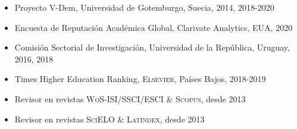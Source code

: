 





\begin{publications}

\begin{itemize}
\item{\small Proyecto V-Dem, Universidad de Gotemburgo, Suecia, 2014, 2018-2020}
\item{\small Encuesta de Reputación Académica Global, Clarivate Analytics, EUA, 2020}
\item{\small Comisión Sectorial de Investigación, Universidad de la Rep\'ublica, Uruguay, 2016, 2018}
\item{\small Times Higher Education Ranking, {\scshape Elsevier}, 
Países Bajos, 2018-2019}
\item{\small Revisor en revistas {\scshape WoS-ISI/SSCI/ESCI} \& {\scshape Scopus}, desde 2013}
\item{\small Revisor en revistas {\scshape SciELO} \& {\scshape Latindex}, desde 2013}
\end{itemize}

\vspace{1mm}
\end{publications}

